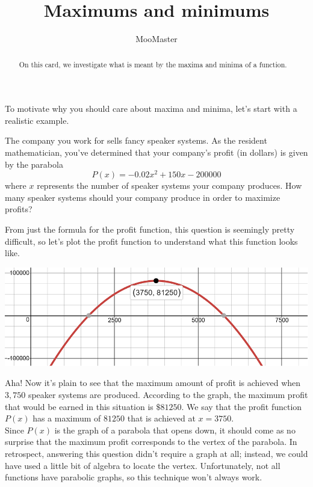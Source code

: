 \documentclass{ximera}
\title[Dig-In]{Maximums and minimums}
\author{MooMaster}
\begin{document}
\begin{abstract}
On this card, we investigate what is meant by the maxima and minima of a function.  
\end{abstract}
\maketitle

To motivate why you should care about maxima and minima, let's start with a realistic example. 

\begin{example}
The company you work for sells fancy speaker systems.  As the resident mathematician, you've determined that your company's profit (in dollars) is given by the parabola
\[ P(x) = -0.02x^2 + 150x-200000 \]
where $x$ represents the number of speaker systems your company produces.  How many speaker systems should your company produce in order to maximize profits? 
\begin{explanation}
From just the formula for the profit function, this question is seemingly pretty difficult, so let's plot the profit function to understand what this function looks like.  

\begin{center} \includegraphics[scale=0.5]{extrema1new.png} \end{center}

\underline{\hspace{5in}}

Aha!  Now it's plain to see that the maximum amount of profit is achieved when $3,750$ speaker systems are produced.  According to the graph, the maximum profit that would be earned in this situation is $\$81250$.  We say that the profit function $P(x)$ has a maximum of $81250$ that is achieved at $x=3750$.  \\

Since $P(x)$ is the graph of a parabola that opens down, it should come as no surprise that the maximum profit corresponds to the vertex of the parabola.  In retrospect, answering this question didn't require a graph at all; instead, we could have used a little bit of algebra to locate the vertex.  Unfortunately, not all functions have parabolic graphs, so this technique won't always work. 

\end{explanation}
\end{example}
\end{document}
